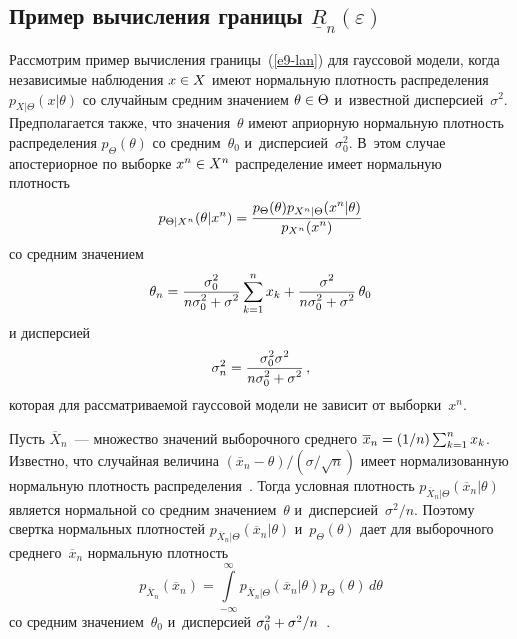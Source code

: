 \begin{multicols}{2}
\section{Пример вычисления границы $\underline{R}_n(\varepsilon)$}
 
Рассмотрим пример вычисления границы~(\ref{e9-lan}) для гауссовой модели, когда 
независимые наблюдения $x\hm\in X$ имеют нормальную плот\-ность распределения 
$p_{X\vert\Theta} (x\vert \theta)$ со случайным сред\-ним значением $\theta\hm\in \Theta$ 
и~известной дисперсией~$\sigma^2$. Предполагается так\-же, что значения~$\theta$ имеют 
априорную нормальную плот\-ность распределения $p_{\Theta}(\theta)$ со средним~$\theta_0$ 
и~дисперсией~$\sigma_0^2$. В~этом случае апостериорное по выборке $x^n\hm\in X^n$ 
распределение имеет нормальную плот\-ность~\cite{7-lan} 
$$
p_{\Theta\vert X^n} (\theta\vert x^n) =\displaystyle\frac{\displaystyle p_{\Theta} (\theta) p_{X^n\vert \Theta} (x^n\vert \theta) \mathstrut}{\displaystyle p_{X^n}(x^n)\mathstrut}
$$
со средним значением
\begin{equation}
\theta_n= \displaystyle\frac{\displaystyle \sigma_0^2\mathstrut}{\displaystyle n\sigma_0^2+\sigma^2\mathstrut} \sum\limits^n_{k=1} x_k 
+\displaystyle\frac{\displaystyle \sigma^2\mathstrut}{\displaystyle n\sigma_0^2+\sigma^2\mathstrut}\, \theta_0
\label{e16-lan}
\end{equation}
и дисперсией 
\begin{equation}
\sigma_n^2= \displaystyle\frac{\displaystyle \sigma_0^2\sigma^2\mathstrut}{\displaystyle n\sigma_0^2+\sigma^2\mathstrut}\,,
\label{e17-lan}
\end{equation}
которая для рас\-смат\-ри\-ва\-емой гауссовой модели не зависит от выборки~$x^n$.

Пусть $\overline{X}_n$~--- множество значений выборочного среднего $\overline{x}_n\hm= 
(1/n) \sum\nolimits^n_{k=1} x_k$. Известно, что случайная величина ${(\overline{x}_n - 
\theta)}/({\sigma/\sqrt{n}})$ имеет нормализованную нормальную плот\-ность  
распределения~\cite{13-lan}. Тогда условная плот\-ность $p_{\overline{X}_n\vert\Theta} 
(\overline{x}_n\vert \theta)$ является нормальной со средним значением~$\theta$ 
и~дисперсией~$\sigma^2/n$. Поэтому свертка нормальных плотностей 
$p_{\overline{X}_n\vert\Theta} (\overline{x}_n\vert \theta)$ и~$p_\Theta(\theta)$ дает для 
выборочного среднего~$\overline{x}_n$ нормальную плот\-ность 
\begin{equation}
p_{\overline{X}_n} (\overline{x}_n) =\int\limits_{-\infty}^{\infty} p_{\overline{X}_n\vert\Theta} 
(\overline{x}_n\vert \theta) p_\Theta (\theta)\,d\theta
\label{e18-lan}
\end{equation}
со сред\-ним значением~$\theta_0$ и~дисперсией $\sigma_0^2\hm+ \sigma^2/n$~\cite{13-lan}.


\end{multicols}
